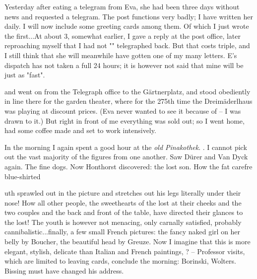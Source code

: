 
Yesterday after eating a telegram from Eva, she had been three days without news and requested a telegram. The post functions very badly; I have written her daily. I will now include some greeting cards among them. Of which I just wrote the first...At about 3, somewhat earlier, I gave a reply at the post office, later reproaching myself that I had not "" telegraphed back. But that costs triple, and I still think that she will meanwhile have gotten one of my many letters. E's dispatch has not taken a full 24 hours; it is however not said that mine will be just as "fast".

 and went on from the Telegraph office to the Gärtnerplatz, and stood obediently in line there for the garden theater, where for the 275th time the Dreimäderlhaus was playing at discount prices. (Eva never wanted to see it because of  -- I was drawn to it.) But right in front of me everything was sold out; so I went home, had some coffee made and set to work intensively. \missing

In the morning I again spent a good hour at the \textit{old Pinakothek}. . I cannot pick out the vast majority of the figures  from one another. Saw Dürer and Van Dyck again. The fine dogs. Now Honthorst discovered: the lost son. How the fat carefre blue-shirted 

uth sprawled out in the picture and stretches out his legs literally under their nose! How all other people, the sweethearts of the lost at their cheeks and the two couples and the back and front of the table, have directed their glances to the lost! The youth is however not menacing, only carnally satisfied, probably cannibalistic...finally, a few small French pictures: the fancy naked girl on her belly by Boucher, the beautiful head by Greuze. Now I imagine that this is more elegant, stylish, delicate than Italian and French paintings, ? -- 
Professor visits, which are limited to leaving cards, conclude the morning: Borinski, Wolters. Bissing must have changed his address. \missing
 